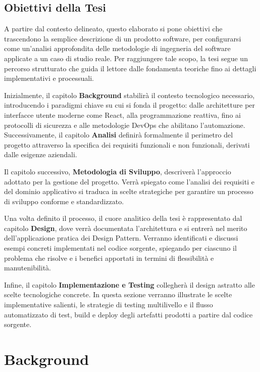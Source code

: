 \documentclass[12pt,a4paper,openright,twoside]{book}
\begin{document}
\section{Obiettivi della Tesi}
\label{sec:obiettivi_tesi}

A partire dal contesto delineato, questo elaborato si pone obiettivi che trascendono la semplice descrizione di un prodotto software, per configurarsi come un'analisi approfondita delle metodologie di ingegneria del software applicate a un caso di studio reale. Per raggiungere tale scopo, la tesi segue un percorso strutturato che guida il lettore dalle fondamenta teoriche fino ai dettagli implementativi e processuali.

Inizialmente, il capitolo \textbf{Background} stabilirà il contesto tecnologico necessario, introducendo i paradigmi chiave su cui si fonda il progetto: dalle architetture per interfacce utente moderne come React, alla programmazione reattiva, fino ai protocolli di sicurezza e alle metodologie DevOps che abilitano l'automazione. Successivamente, il capitolo \textbf{Analisi} definirà formalmente il perimetro del progetto attraverso la specifica dei requisiti funzionali e non funzionali, derivati dalle esigenze aziendali.

Il capitolo successivo, \textbf{Metodologia di Sviluppo}, descriverà l'approccio adottato per la gestione del progetto. Verrà spiegato come l'analisi dei requisiti e del dominio applicativo si traduca in scelte strategiche per garantire un processo di sviluppo conforme e standardizzato.

Una volta definito il processo, il cuore analitico della tesi è rappresentato dal capitolo \textbf{Design}, dove verrà documentata l'architettura e si entrerà nel merito dell'applicazione pratica dei Design Pattern. Verranno identificati e discussi esempi concreti implementati nel codice sorgente, spiegando per ciascuno il problema che risolve e i benefici apportati in termini di flessibilità e manutenibilità.

Infine, il capitolo \textbf{Implementazione e Testing} collegherà il design astratto alle scelte tecnologiche concrete. In questa sezione verranno illustrate le scelte implementative salienti, le strategie di testing multilivello e il flusso automatizzato di test, build e deploy degli artefatti prodotti a partire dal codice sorgente.

\chapter{Background}
\label{chap:background}
\end{document}
